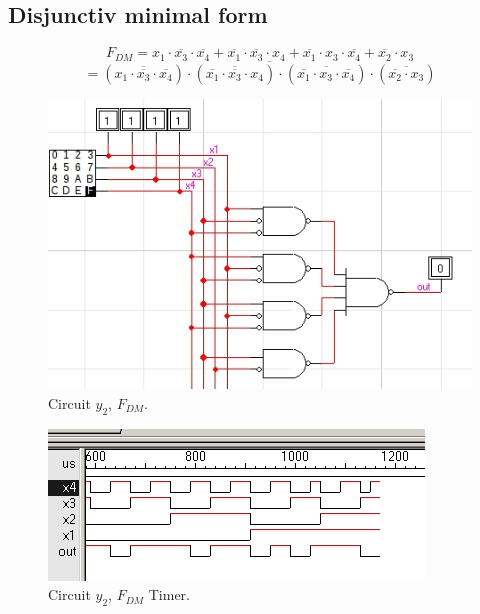 \documentclass{article}
\begin{document}
		\newpage
		\subsection{Disjunctiv minimal form} %
			\[
				\textbf{$F_{DM}$} =
					x_1 \cdot \overline{x_3} \cdot \overline{x_4} +
					\overline{x_1} \cdot \overline{x_3} \cdot x_4 +
					\overline{x_1} \cdot x_3 \cdot \overline{x_4} +
					\overline{x_2} \cdot x_3
			\]
			\[
				= \overline{
					(\overline{x_1 \cdot \overline{x_3} \cdot \overline{x_4}}) \cdot
					(\overline{\overline{x_1} \cdot \overline{x_3} \cdot x_4}) \cdot
					(\overline{\overline{x_1} \cdot x_3 \cdot \overline{x_4}}) \cdot
					(\overline{\overline{x_2} \cdot x_3})
				}
			\]

			\begin{center} \begin{figure}[!ht]
				\begin{mdframed} \begin{center}
					\includegraphics[scale=0.5]{./imgs/Circuit1_FDM_ex2.jpg}
					\caption{Circuit $y_2$, $F_{DM}$.}
				\end{center} \end{mdframed}
				\label{fig:circuit_y2_fdm}
			\end{figure} \end{center}
			
			\begin{center} \begin{figure}[!ht]
				\begin{mdframed} \begin{center}
					\includegraphics[scale=0.5]{./imgs/Circuit1_FDM_ex2_timer.jpg}
					\caption{Circuit $y_2$, $F_{DM}$ Timer.}
				\end{center} \end{mdframed}
				\label{fig:circuit_y2_fdm_timer}
			\end{figure} \end{center}
\end{document}
